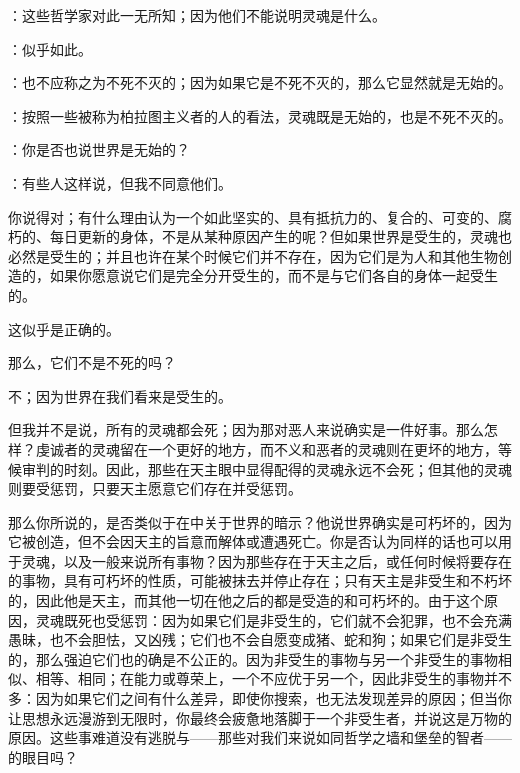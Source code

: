 ：这些哲学家对此一无所知；因为他们不能说明灵魂是什么。\par

：似乎如此。\par

：也不应称之为不死不灭的；因为如果它是不死不灭的，那么它显然就是无始的。\par

：按照一些被称为柏拉图主义者的人的看法，灵魂既是无始的，也是不死不灭的。\par

：你是否也说世界是无始的？\par

：有些人这样说，但我不同意他们。\par

你说得对；有什么理由认为一个如此坚实的、具有抵抗力的、复合的、可变的、腐朽的、每日更新的身体，不是从某种原因产生的呢？但如果世界是受生的，灵魂也必然是受生的；并且也许在某个时候它们并不存在，因为它们是为人和其他生物创造的，如果你愿意说它们是完全分开受生的，而不是与它们各自的身体一起受生的。\par

这似乎是正确的。\par

那么，它们不是不死的吗？\par

不；因为世界在我们看来是受生的。\par

但我并不是说，所有的灵魂都会死；因为那对恶人来说确实是一件好事。那么怎样？虔诚者的灵魂留在一个更好的地方，而不义和恶者的灵魂则在更坏的地方，等候审判的时刻。因此，那些在天主眼中显得配得的灵魂永远不会死；但其他的灵魂则要受惩罚，只要天主愿意它们存在并受惩罚。\par

那么你所说的，是否类似于在中关于世界的暗示？他说世界确实是可朽坏的，因为它被创造，但不会因天主的旨意而解体或遭遇死亡。你是否认为同样的话也可以用于灵魂，以及一般来说所有事物？因为那些存在于天主之后，或任何时候将要存在的事物，具有可朽坏的性质，可能被抹去并停止存在；只有天主是非受生和不朽坏的，因此他是天主，而其他一切在他之后的都是受造的和可朽坏的。由于这个原因，灵魂既死也受惩罚：因为如果它们是非受生的，它们就不会犯罪，也不会充满愚昧，也不会胆怯，又凶残；它们也不会自愿变成猪、蛇和狗；如果它们是非受生的，那么强迫它们也的确是不公正的。因为非受生的事物与另一个非受生的事物相似、相等、相同；在能力或尊荣上，一个不应优于另一个，因此非受生的事物并不多：因为如果它们之间有什么差异，即使你搜索，也无法发现差异的原因；但当你让思想永远漫游到无限时，你最终会疲惫地落脚于一个非受生者，并说这是万物的原因。这些事难道没有逃脱与——那些对我们来说如同哲学之墙和堡垒的智者——的眼目吗？\par

